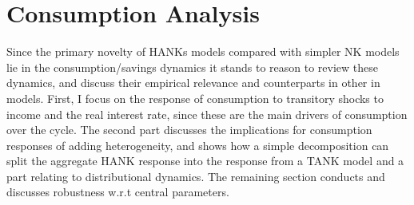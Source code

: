 


\pagebreak 
\section{Consumption Analysis}
Since the primary novelty of HANKs models compared with simpler NK models lie in the consumption/savings dynamics it stands to reason to review these dynamics, and discuss their empirical relevance and counterparts in other in models. First, I focus on the response of consumption to transitory shocks to income and the real interest rate, since these are the main drivers of consumption over the cycle. The second part discusses the implications for consumption responses of adding heterogeneity, and shows how a simple decomposition can split the aggregate HANK response into the response from a TANK model and a part relating to distributional dynamics. The remaining section conducts and discusses robustness w.r.t central parameters. 




